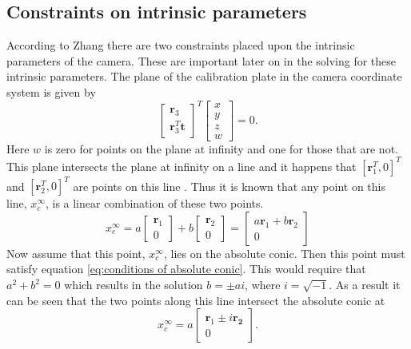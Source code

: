 \subsection{Constraints on intrinsic parameters}
\label{sec: intrinsic constraints}
According to Zhang \cite{emerging} there are two constraints placed upon the intrinsic parameters of the camera. These are important later on in the solving for these intrinsic parameters. The plane of the calibration plate in the camera coordinate system is given by \cite{emerging} 
\begin{equation}
	\begin{bmatrix}
	\bm{r}_3 \\
	\bm{r}_3^T \bm{t}
	\end{bmatrix}^T
	\begin{bmatrix}
	x \\
	y \\
	z \\
	w
	\end{bmatrix} = 0.
\end{equation}
Here $w$ is zero for points on the plane at infinity and one for those that are not. This plane intersects the plane at infinity on a line and it happens that $[\bm{r}_1^T, 0]^T$ and $[\bm{r}_2^T, 0]^T$ are points on this line \cite{emerging}. Thus it is known that any point on this line, $x_c^{\infty}$, is a linear combination of these two points.
\begin{equation}
	x_c^{\infty} = a \begin{bmatrix}
	\bm{r}_1 \\
	0
	\end{bmatrix} + b
	\begin{bmatrix}
	\bm{r}_2 \\
	0
	\end{bmatrix} =
	\begin{bmatrix}
	a \bm{r}_1 + b \bm{r}_2 \\
	0
	\end{bmatrix}
\end{equation}
Now assume that this point, $x_c^{\infty}$, lies on the absolute conic. Then this point must satisfy equation \ref{eq:conditions of absolute conic}. This would require that $a^2+b^2=0$ which results in the solution $b=\pm a i$, where $i=\sqrt{-1}$. As a result it can be seen that the two points along this line intersect the absolute conic at
\begin{equation}
	x_c^{\infty} = a 
	\begin{bmatrix}
	\bm{r}_1 \pm i \bm{r_2} \\
	0
	\end{bmatrix}.
\end{equation}
